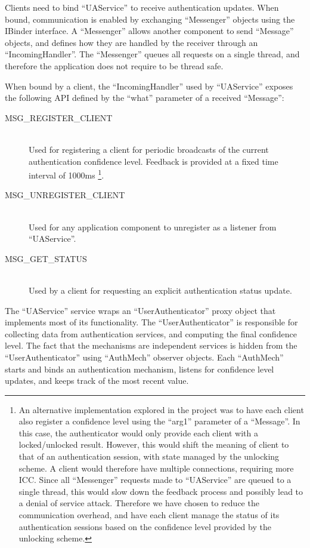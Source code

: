 Clients need to bind ``UAService'' to receive authentication updates. When bound, communication is enabled by exchanging ``Messenger'' objects using the IBinder interface. A ``Messenger'' allows another component to send ``Message'' objects, and defines how they are handled by the receiver through an ``IncomingHandler''. The ``Messenger'' queues all requests on a single thread, and therefore the application does not require to be thread safe. 

When bound by a client, the ``IncomingHandler'' used by ``UAService''  exposes the following API defined by the ``what'' parameter of a received ``Message'': 
\begin{description}
  \item[MSG\_REGISTER\_CLIENT] \hfill \\
  Used for registering a client for periodic broadcasts of the current authentication confidence level. Feedback is provided at a fixed time interval of 1000ms \footnote{An alternative implementation explored in the project was to have each client also register a confidence level using the ``arg1'' parameter of a ``Message''. In this case, the authenticator would only provide each client with a locked/unlocked result. However, this would shift the meaning of client to that of an authentication session, with state managed by the unlocking scheme. A client would therefore have multiple connections, requiring more ICC. Since all ``Messenger'' requests made to ``UAService'' are queued to a single thread, this would slow down the feedback process and possibly lead to a denial of service attack. Therefore we have chosen to reduce the communication overhead, and have each client manage the status of its authentication sessions based on the confidence level provided by the unlocking scheme.}.

  \item[MSG\_UNREGISTER\_CLIENT] \hfill \\
  Used for any application component to unregister as a listener from ``UAService''.
  
  \item[MSG\_GET\_STATUS] \hfill \\
  Used by a client for requesting an explicit authentication status update.
\end{description}

The ``UAService'' service wraps an ``UserAuthenticator'' proxy object that implements most of its functionality. The ``UserAuthenticator'' is responsible for collecting data from authentication services, and computing the final confidence level. The fact that the mechanisms are independent services is hidden from the ``UserAuthenticator'' using ``AuthMech'' observer objects. Each ``AuthMech'' starts and binds an authentication mechanism, listens for confidence level updates, and keeps track of the most recent value.
 
